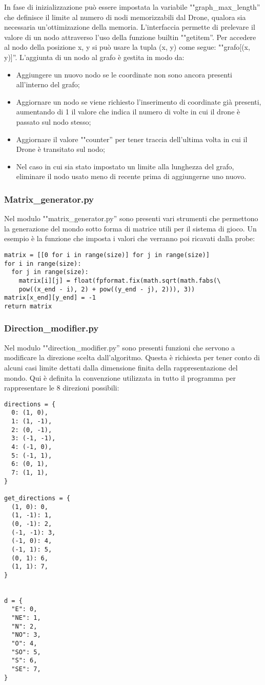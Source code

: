 In fase di inizializzazione può essere impostata la variabile ""graph\_max\_length'' che definisce il limite al numero di nodi memorizzabili dal Drone, qualora sia necessaria un'ottimizazione della memoria. 
L'interfaccia permette di prelevare il valore di un nodo attraverso l'uso della funzione builtin ""getitem''. Per accedere al nodo della posizione x, y si può usare la tupla (x, y) come segue: ""grafo[(x, y)]''. 
L'aggiunta di un nodo al grafo è gestita in modo da:
\begin{itemize}
\item Aggiungere un nuovo nodo se le coordinate non sono ancora presenti all'interno del grafo;

\item Aggiornare un nodo se viene richiesto l'inserimento di coordinate già presenti, aumentando di 1 il valore che indica il numero di volte in cui il drone è passato sul nodo stesso; 

\item Aggiornare il valore ""counter'' per tener traccia dell'ultima volta in cui il Drone è transitato sul nodo;

\item Nel caso in cui sia stato impostato un limite alla lunghezza del grafo, eliminare il nodo usato meno di recente prima di aggiungerne uno nuovo.
\end{itemize}
\subsubsection{Matrix\_generator.py}
Nel modulo ""matrix\_generator.py'' sono presenti vari strumenti che permettono la generazione del mondo sotto forma di matrice utili per il sistema di gioco. Un esempio è la funzione che imposta i valori che verranno poi ricavati dalla probe:
\begin{verbatim}
matrix = [[0 for i in range(size)] for j in range(size)]
for i in range(size):
  for j in range(size):
    matrix[i][j] = float(fpformat.fix(math.sqrt(math.fabs(\
    pow((x_end - i), 2) + pow((y_end - j), 2))), 3))
matrix[x_end][y_end] = -1
return matrix
\end{verbatim}

\subsubsection{Direction\_modifier.py}
Nel modulo ""direction\_modifier.py'' sono presenti funzioni che servono a modificare la direzione scelta dall'algoritmo. Questa è richiesta per tener conto di alcuni casi limite dettati dalla dimensione finita della rappresentazione del mondo. Qui è definita la convenzione utilizzata in tutto il programma per rappresentare le 8 direzioni possibili:
\begin{verbatim}
directions = {
  0: (1, 0),
  1: (1, -1),
  2: (0, -1),
  3: (-1, -1),
  4: (-1, 0),
  5: (-1, 1),
  6: (0, 1),
  7: (1, 1),
}

get_directions = {
  (1, 0): 0,
  (1, -1): 1,
  (0, -1): 2,
  (-1, -1): 3,
  (-1, 0): 4,
  (-1, 1): 5,
  (0, 1): 6,
  (1, 1): 7,
}


d = {
  "E": 0,
  "NE": 1,
  "N": 2,
  "NO": 3,
  "O": 4,
  "SO": 5,
  "S": 6,
  "SE": 7,
}
\end{verbatim}

